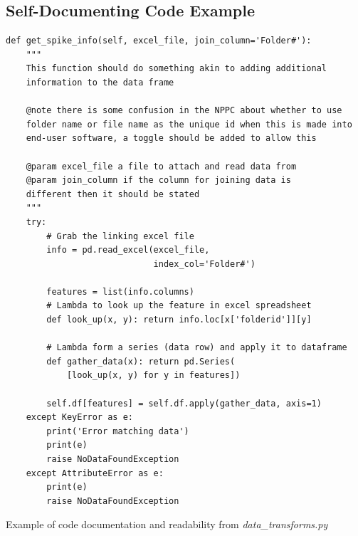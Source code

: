 \documentclass[11pt]{report}
\begin{document}
\subsection{Self-Documenting Code Example}
\label{sec-7-3-3}
\begin{listing}[H]
\begin{verbatim}
def get_spike_info(self, excel_file, join_column='Folder#'):
    """
    This function should do something akin to adding additional
    information to the data frame

    @note there is some confusion in the NPPC about whether to use
    folder name or file name as the unique id when this is made into
    end-user software, a toggle should be added to allow this

    @param excel_file a file to attach and read data from
    @param join_column if the column for joining data is
    different then it should be stated
    """
    try:
        # Grab the linking excel file
        info = pd.read_excel(excel_file,
                             index_col='Folder#')

        features = list(info.columns)
        # Lambda to look up the feature in excel spreadsheet
        def look_up(x, y): return info.loc[x['folderid']][y]

        # Lambda form a series (data row) and apply it to dataframe
        def gather_data(x): return pd.Series(
            [look_up(x, y) for y in features])

        self.df[features] = self.df.apply(gather_data, axis=1)
    except KeyError as e:
        print('Error matching data')
        print(e)
        raise NoDataFoundException
    except AttributeError as e:
        print(e)
        raise NoDataFoundException
\end{verbatim}
\caption{\label{lst:docexample}Example of code documentation and readability from \emph{data\_transforms.py}}
\end{listing}

\clearpage


\end{document}
